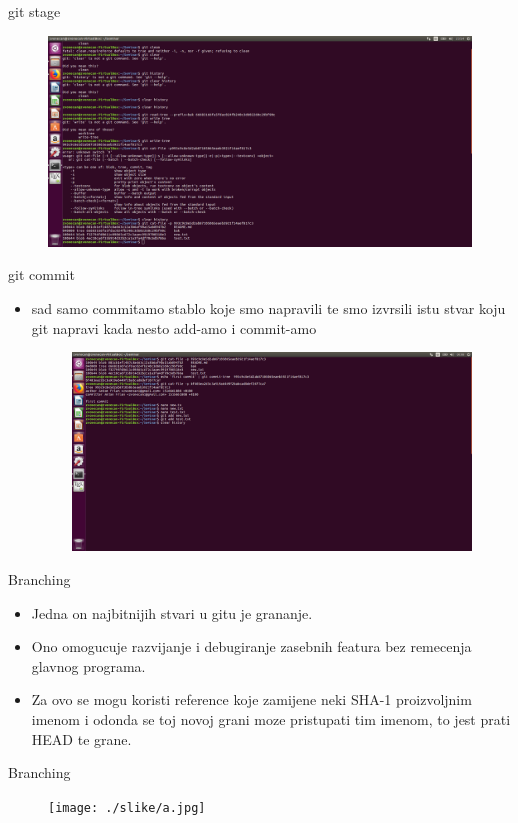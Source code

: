 \documentclass[]{beamer}
\begin{document}
\begin{frame}{git stage}
	\begin{figure}
		\centering
	\includegraphics[width=1\textwidth]{./slike/sesta_slika.jpg}
	\end{figure}


\end{frame}

\begin{frame}{git commit}

\begin{itemize}
	\item sad samo commitamo stablo koje smo napravili te smo izvrsili istu stvar koju git napravi kada nesto add-amo i commit-amo
	\begin{figure}
		\centering
	\includegraphics[width=1\textwidth]{./slike/sedma_slika.jpg}
	\end{figure}
\end{itemize}
\end{frame}
\begin{frame}{Branching}
	\begin{itemize}
	\item Jedna on najbitnijih stvari u gitu je grananje.
	\item Ono omogucuje razvijanje i debugiranje zasebnih featura bez remecenja glavnog programa. 
	\item Za ovo se mogu koristi reference koje zamijene neki SHA-1 proizvoljnim imenom i odonda se toj novoj grani moze pristupati tim imenom, to jest prati HEAD te grane.
	\end{itemize}
	
\end{frame}
\begin{frame}{Branching}
\begin{figure}
		\centering
	\texttt{[image: ./slike/a.jpg]}
	\end{figure}
\end{frame}
\end{document}
